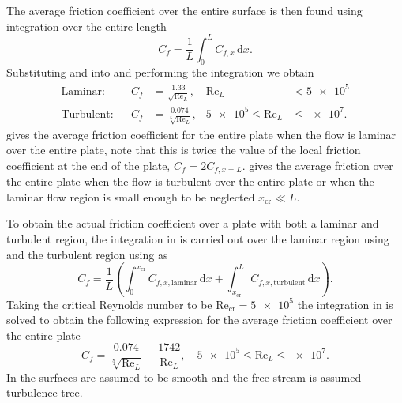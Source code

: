 The average friction coefficient over the entire surface is then found using integration over the entire length 
\begin{equation} \label{eq:avgfriction}
  C_f = \frac{1}{L} \int_{0}^{L} C_{f,x} \, \mathrm{d}x
.\end{equation}
Substituting  and  into  and performing the integration we obtain 
\begin{align}
  \text{Laminar:}& & C_f &= \frac{\num{1,33}}{\sqrt{\mathrm{Re}_L}}, & \mathrm{Re}_L &< \num{5e5}  \label{eq:laminarfrictioncoeff} \\
  \text{Turbulent:}& & C_f &= \frac{\num{0,074}}{\sqrt[5]{\mathrm{Re}_L}}, & \num{5e5} \leq \mathrm{Re}_L &\leq \num{e7} \label{eq:turbulentfrictioncoeff}
.\end{align}
 gives the average friction coefficient for the entire plate when the flow is laminar over the entire plate, note that this is twice the value of the local friction coefficient at the end of the plate, $C_f = 2 C_{f,x=L}$.
 gives the average friction over the entire plate when the flow is turbulent over the entire plate or when the laminar flow region is small enough to be neglected $x_{\mathrm{cr}} \ll L$.

To obtain the actual friction coefficient over a plate with both a laminar and turbulent region, the integration in  is carried out over the laminar region using  and the turbulent region using  as 
\begin{equation} \label{eq:frictioncoeffplate}
  C_f = \frac{1}{L} \left( \int_{0}^{x_{\mathrm{cr}}} C_{f,x, \text{laminar}} \, \mathrm{d}x  + \int_{x_{\mathrm{cr}}}^{L} C_{f, x, \text{turbulent}} \, \mathrm{d}x  \right)
.\end{equation}
Taking the critical Reynolds number to be $\mathrm{Re}_{\mathrm{cr}} = \num{5e5}$ the integration in  is solved to obtain the following expression for the average friction coefficient over the entire plate
\begin{equation} \label{eq:frictioncoeffplatesimplified}
  C_f = \frac{\num{0,074} }{\sqrt[5]{\mathrm{Re}_L}} - \frac{1742}{\mathrm{Re}_L}, \quad \num{5e5} \leq \mathrm{Re}_L \leq \num{e7} 
.\end{equation}
In  the surfaces are assumed to be smooth and the free stream is assumed turbulence tree.

